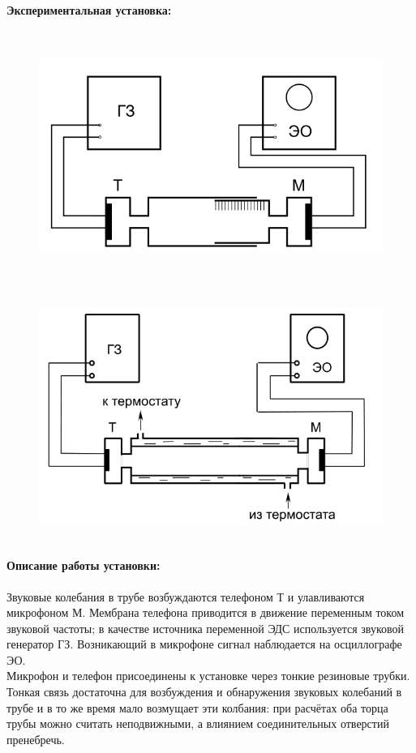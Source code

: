 \documentclass[a4paper]{article}
\begin{document}
	\paragraph{Экспериментальная установка:}
	\begin{figure}[ht!]
		\centering
		\includegraphics[height=80mm]{pic1.png}
	\end{figure}
	\begin{figure}[ht!]
		\centering
		\includegraphics[height=80mm]{pic2.png}
	\end{figure}
	\newpage
	\paragraph{Описание работы установки:}
	Звуковые колебания в трубе возбуждаются телефоном Т и улавливаются микрофоном М. Мембрана телефона приводится в движение переменным током звуковой частоты; в качестве источника переменной ЭДС используется звуковой генератор ГЗ. Возникающий в микрофоне сигнал наблюдается на осциллографе ЭО. \\
	Микрофон и телефон присоединены к установке через тонкие резиновые трубки. Тонкая связь достаточна для возбуждения и обнаружения звуковых колебаний в трубе и в то же время мало возмущает эти колбания: при расчётах оба торца трубы можно считать неподвижными, а влиянием соединительных отверстий пренебречь. 
\end{document}
